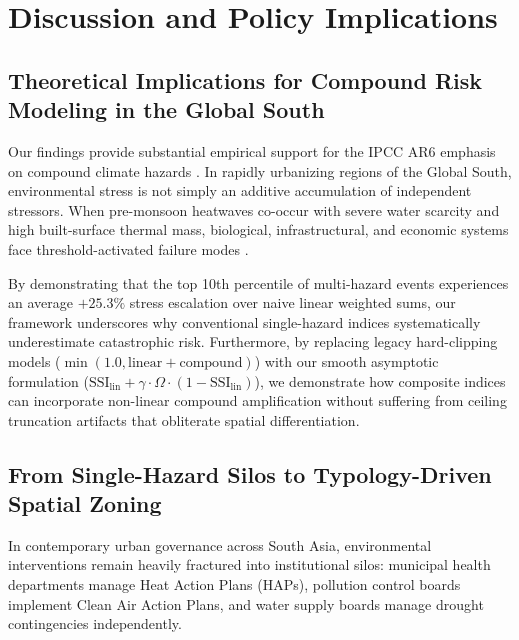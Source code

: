 \section{Discussion and Policy Implications}
\label{sec:discussion}

\subsection{Theoretical Implications for Compound Risk Modeling in the Global South}
Our findings provide substantial empirical support for the IPCC AR6 emphasis on compound climate hazards \citep{ipcc2022ar6}. In rapidly urbanizing regions of the Global South, environmental stress is not simply an additive accumulation of independent stressors. When pre-monsoon heatwaves co-occur with severe water scarcity and high built-surface thermal mass, biological, infrastructural, and economic systems face threshold-activated failure modes \citep{zscheischler2018future}.

By demonstrating that the top 10th percentile of multi-hazard events experiences an average $+25.3\%$ stress escalation over naive linear weighted sums, our framework underscores why conventional single-hazard indices systematically underestimate catastrophic risk. Furthermore, by replacing legacy hard-clipping models ($\min(1.0, \text{linear} + \text{compound})$) with our smooth asymptotic formulation ($\text{SSI}_{\text{lin}} + \gamma \cdot \Omega \cdot (1 - \text{SSI}_{\text{lin}})$), we demonstrate how composite indices can incorporate non-linear compound amplification without suffering from ceiling truncation artifacts that obliterate spatial differentiation.

\subsection{From Single-Hazard Silos to Typology-Driven Spatial Zoning}
In contemporary urban governance across South Asia, environmental interventions remain heavily fractured into institutional silos: municipal health departments manage Heat Action Plans (HAPs), pollution control boards implement Clean Air Action Plans, and water supply boards manage drought contingencies independently.

